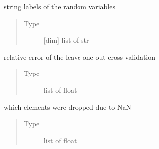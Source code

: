 \documentclass[letterpaper,10pt,english,openany,oneside]{sphinxmanual}
\begin{document}
\begin{fulllineitems}
\begin{fulllineitems}
\begin{quote}
\begin{description}
\end{description}\end{quote}

\end{fulllineitems}


\begin{fulllineitems}
\label{\detokenize{pygpc:pygpc.reg.Reg.random_vars}}
string labels of the random variables
\begin{quote}\begin{description}
\item[{Type}] \leavevmode
{[}dim{]} list of str

\end{description}\end{quote}

\end{fulllineitems}


\begin{fulllineitems}
\label{\detokenize{pygpc:pygpc.reg.Reg.relative_error_loocv}}
relative error of the leave-one-out-cross-validation
\begin{quote}\begin{description}
\item[{Type}] \leavevmode
list of float

\end{description}\end{quote}

\end{fulllineitems}


\begin{fulllineitems}
\label{\detokenize{pygpc:pygpc.reg.Reg.nan_elm}}
which elements were dropped due to NaN
\begin{quote}\begin{description}
\item[{Type}] \leavevmode
list of float

\end{description}\end{quote}

\end{fulllineitems}


\end{fulllineitems}
\end{document}
